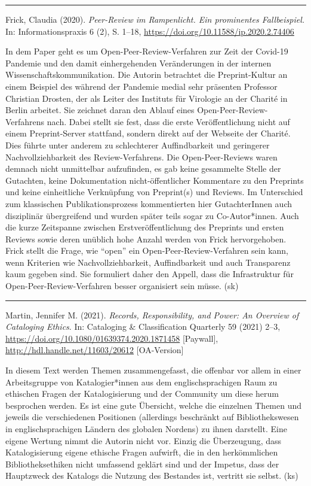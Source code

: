 \documentclass[a4paper,
fontsize=11pt,
oneside,
numbers=noperiodatend,
parskip=half-,
bibliography=totoc,
final
]{scrartcl}
\begin{document}
\begin{center}\rule{0.5\linewidth}{0.5pt}\end{center}

Frick, Claudia (2020). \emph{Peer-Review im Rampenlicht. Ein prominentes
Fallbeispiel.} In: Informationspraxis 6 (2), S. 1--18,
\url{https://doi.org/10.11588/ip.2020.2.74406}

In dem Paper geht es um Open-Peer-Review-Verfahren zur Zeit der Covid-19
Pandemie und den damit einhergehenden Veränderungen in der internen
Wissenschaftskommunikation. Die Autorin betrachtet die Preprint-Kultur
an einem Beispiel des während der Pandemie medial sehr präsenten
Professor Christian Drosten, der als Leiter des Instituts für Virologie
an der Charité in Berlin arbeitet. Sie zeichnet daran den Ablauf eines
Open-Peer-Review-Verfahrens nach. Dabei stellt sie fest, dass die erste
Veröffentlichung nicht auf einem Preprint-Server stattfand, sondern
direkt auf der Webseite der Charité. Dies führte unter anderem zu
schlechterer Auffindbarkeit und geringerer Nachvollziehbarkeit des
Review-Verfahrens. Die Open-Peer-Reviews waren demnach nicht unmittelbar
aufzufinden, es gab keine gesammelte Stelle der Gutachten, keine
Dokumentation nicht-öffentlicher Kommentare zu den Preprints und keine
einheitliche Verknüpfung von Preprint(s) und Reviews. Im Unterschied zum
klassischen Publikationsprozess kommentierten hier GutachterInnen auch
disziplinär übergreifend und wurden später teils sogar zu
Co-Autor*innen. Auch die kurze Zeitspanne zwischen Erstveröffentlichung
des Preprints und ersten Reviews sowie deren unüblich hohe Anzahl werden
von Frick hervorgehoben. Frick stellt die Frage, wie \enquote{open} ein
Open-Peer-Review-Verfahren sein kann, wenn Kriterien wie
Nachvollziehbarkeit, Auffindbarkeit und auch Transparenz kaum gegeben
sind. Sie formuliert daher den Appell, dass die Infrastruktur für
Open-Peer-Review-Verfahren besser organisiert sein müsse. (sk)

\begin{center}\rule{0.5\linewidth}{0.5pt}\end{center}

Martin, Jennifer M. (2021). \emph{Records, Responsibility, and Power: An
Overview of Cataloging Ethics}. In: Cataloging \& Classification
Quarterly 59 (2021) 2--3,
\url{https://doi.org/10.1080/01639374.2020.1871458} {[}Paywall{]},
\url{http://hdl.handle.net/11603/20612} {[}OA-Version{]}

In diesem Text werden Themen zusammengefasst, die offenbar vor allem in
einer Arbeitsgruppe von Katalogier*innen aus dem englischsprachigen Raum
zu ethischen Fragen der Katalogisierung und der Community um diese herum
besprochen werden. Es ist eine gute Übersicht, welche die einzelnen
Themen und jeweils die verschiedenen Positionen (allerdings beschränkt
auf Bibliothekswesen in englischsprachigen Ländern des globalen Nordens)
zu ihnen darstellt. Eine eigene Wertung nimmt die Autorin nicht vor.
Einzig die Überzeugung, dass Katalogisierung eigene ethische Fragen
aufwirft, die in den herkömmlichen Bibliotheksethiken nicht umfassend
geklärt sind und der Impetus, dass der Hauptzweck des Katalogs die
Nutzung des Bestandes ist, vertritt sie selbst. (ks)
\end{document}
